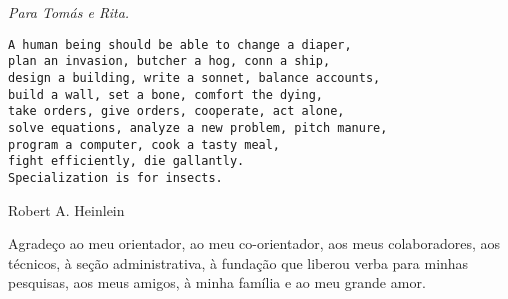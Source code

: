 \newpage

\vspace*{0.75\textheight}
\begin{flushright}
  \emph{Para Tomás e Rita.}
\end{flushright}

\newpage

\vspace*{0.4\textheight}
\noindent{\LARGE\textbf{}}
\begin{verbatim}
A human being should be able to change a diaper, 
plan an invasion, butcher a hog, conn a ship,
design a building, write a sonnet, balance accounts, 
build a wall, set a bone, comfort the dying, 
take orders, give orders, cooperate, act alone, 
solve equations, analyze a new problem, pitch manure, 
program a computer, cook a tasty meal, 
fight efficiently, die gallantly. 
Specialization is for insects.
\end{verbatim}
\begin{flushright}
Robert A. Heinlein
\end{flushright}

\newpage


\doublespacing


Agradeço ao meu orientador, ao meu co-orientador, aos meus colaboradores, aos técnicos, à seção administrativa, à fundação que liberou verba para minhas pesquisas, aos meus amigos, à minha família e ao meu grande amor.

\newpage

